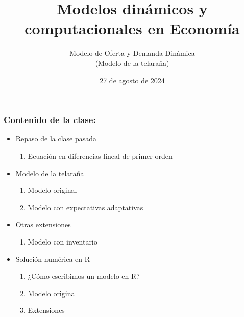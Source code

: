 \documentclass[11pt]{beamer}
\begin{document}
	\title{Modelos dinámicos y computacionales en Economía}
	\subtitle{Modelo de Oferta y Demanda Dinámica \\ (Modelo de la telaraña)}
	\date{27 de agosto de 2024}
	\frame[plain]{\maketitle}

\begin{frame}
\frametitle{Contenido de la clase:}
\begin{itemize}
\item Repaso de la clase pasada
\begin{enumerate}
    \item Ecuación en diferencias lineal de primer orden
\end{enumerate}
	\item Modelo de la telaraña
	\begin{enumerate}
	\item Modelo original 
	\item Modelo con expectativas adaptativas
\end{enumerate}		
	\item Otras extensiones
	\begin{enumerate}
		\item Modelo con inventario 
	\end{enumerate}	
\item Solución numérica en R
	\begin{enumerate}
	\item ¿Cómo escribimos un modelo en R?
	\item Modelo original
	\item Extensiones
\end{enumerate}	
\end{itemize}
\end{frame}
\end{document}
